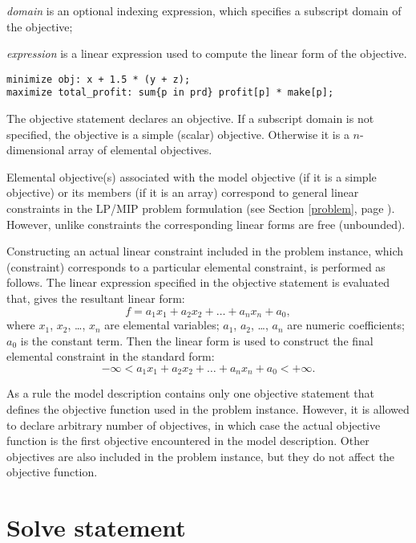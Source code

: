 \documentclass[11pt]{report}
\def\para#1{\noindent{\bf#1}}
\begin{document}
\noindent
{\it domain} is an optional indexing expression, which specifies
a subscript domain of the objective;

\noindent
{\it expression} is a linear expression used to compute the linear form
of the objective.

\newpage

\para{Examples}

\begin{verbatim}
minimize obj: x + 1.5 * (y + z);
maximize total_profit: sum{p in prd} profit[p] * make[p];
\end{verbatim}

The objective statement declares an objective. If a subscript domain is
not specified, the objective is a simple (scalar) objective. Otherwise
it is a $n$-dimensional array of elemental objectives.

Elemental objective(s) associated with the model objective (if it is a
simple objective) or its members (if it is an array) correspond to
general linear constraints in the LP/MIP problem formulation (see
Section \ref{problem}, page \pageref{problem}). However, unlike
constraints the corresponding linear forms are free (unbounded).

Constructing an actual linear constraint included in the problem
instance, which (constraint) corresponds to a particular elemental
constraint, is performed as follows. The linear expression specified in
the objective statement is evaluated that, gives the resultant linear
form:
$$f=a_1x_1+a_2x_2+\dots+a_nx_n+a_0,$$
where $x_1$, $x_2$, \dots, $x_n$ are elemental variables; $a_1$, $a_2$,
\dots, $a_n$ are numeric coefficients; $a_0$ is the constant term. Then
the linear form is used to construct the final elemental constraint in
the standard form:
$$-\infty<a_1x_1+a_2x_2+\dots+a_nx_n+a_0<+\infty.$$

As a rule the model description contains only one objective statement
that defines the objective function used in the problem instance.
However, it is allowed to declare arbitrary number of objectives, in
which case the actual objective function is the first objective
encountered in the model description. Other objectives are also
included in the problem instance, but they do not affect the objective
function.

\section{Solve statement}

\noindent
\framebox[468pt][l]{
\parbox[c][24pt]{468pt}{
\hspace{6pt} {\tt solve} {\tt;}
}}
\end{document}
